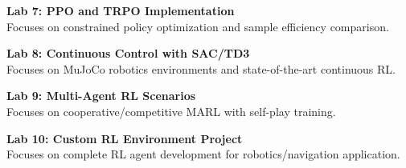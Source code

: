 \vspace{0.2cm}

\noindent\textbf{Lab 7: PPO and TRPO Implementation} \\
Focuses on constrained policy optimization and sample efficiency comparison.

\vspace{0.2cm}

\noindent\textbf{Lab 8: Continuous Control with SAC/TD3} \\
Focuses on MuJoCo robotics environments and state-of-the-art continuous RL.

\vspace{0.2cm}

\noindent\textbf{Lab 9: Multi-Agent RL Scenarios} \\
Focuses on cooperative/competitive MARL with self-play training.

\vspace{0.2cm}

\noindent\textbf{Lab 10: Custom RL Environment Project} \\
Focuses on complete RL agent development for robotics/navigation application.

\vspace{0.2cm}

\newpage
{}

